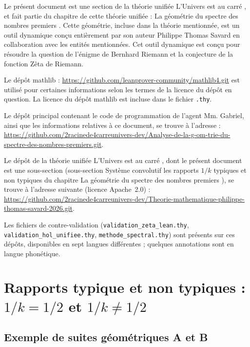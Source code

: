 \documentclass[11pt,a4paper]{article}
\begin{document}
Le présent document est une section de la théorie unifiée \og L'Univers est au
carré \fg{}, et fait partie du chapitre de cette théorie unifiée : \og La
géométrie du spectre des nombres premiers \fg{}. Cette géométrie, incluse dans
la théorie mentionnée, est un outil dynamique conçu entièrement par son auteur
Philippe Thomas Savard en collaboration avec les entités mentionnées. Cet outil
dynamique est conçu pour résoudre la question de l'énigme de Bernhard Riemann
et la conjecture de la fonction Zêta de Riemann.

Le dépôt mathlib : \url{https://github.com/leanprover-community/mathlib4.git}
est utilisé pour certaines informations selon les termes de la licence du dépôt
en question. La licence du dépôt mathlib est incluse dans le fichier \texttt{.thy}.

Le dépôt principal contenant le code de programmation de l'agent Mm. Gabriel,
ainsi que les informations relatives à ce document, se trouve à l'adresse :
\url{https://github.com/2racinede4carreunivers-dev/Analyse-de-la-g-om-trie-du-spectre-des-nombres-premiers.git}.

Le dépôt de la théorie unifiée \og L'Univers est au carré \fg{}, dont le présent
document est une sous-section (sous-section \og Système convolutif les rapports
$1/k$ typiques et non typiques \fg{} du chapitre \og La géométrie du spectre des
nombres premiers \fg{}), se trouve à l'adresse suivante (licence Apache~2.0) :
\url{https://github.com/2racinede4carreunivers-dev/Theorie-mathematique-philippe-thomas-savard-2026.git}.

Les fichiers de contre-validation (\texttt{validation\_zeta\_lean.thy},
\texttt{validation\_hol\_unifiee.thy}, \texttt{methode\_spectral.thy}) sont
présents sur ces dépôts, disponibles en sept langues différentes ; quelques
annotations sont en langue phonétique.

\tableofcontents
\newpage



\section{Rapports typique et non typiques : $1/k = 1/2$ et $1/k \neq 1/2$}

\subsection{Exemple de suites géométriques A et B}
\end{document}
